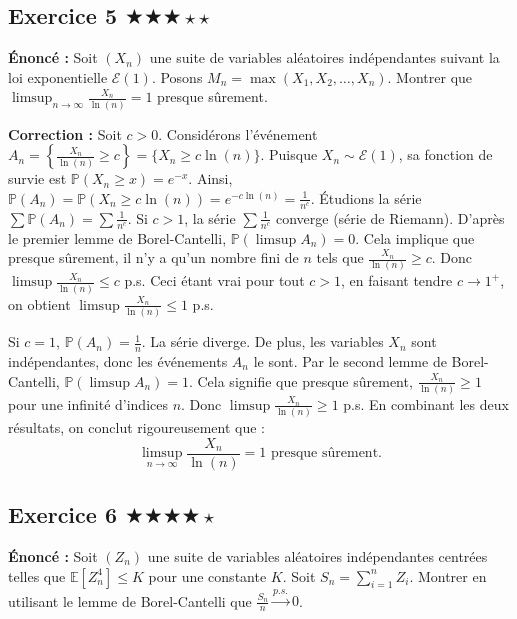 \documentclass[11pt,a4paper]{article}
\begin{document}
\subsection*{Exercice 5 \quad $\bigstar\bigstar\bigstar\star\star$}


\textbf{Énoncé :}
Soit $(X_n)$ une suite de variables aléatoires indépendantes suivant la loi exponentielle $\mathcal{E}(1)$.
Posons $M_n = \max(X_1, X_2, \dots, X_n)$.
Montrer que $\limsup_{n \to \infty} \frac{X_n}{\ln(n)} = 1$ presque sûrement.

\textbf{Correction :}
Soit $c > 0$. Considérons l'événement $A_n = \left\{ \frac{X_n}{\ln(n)} \ge c \right\} = \{ X_n \ge c \ln(n) \}$.
Puisque $X_n \sim \mathcal{E}(1)$, sa fonction de survie est $\mathbb{P}(X_n \ge x) = e^{-x}$.
Ainsi, $\mathbb{P}(A_n) = \mathbb{P}(X_n \ge c \ln(n)) = e^{-c \ln(n)} = \frac{1}{n^c}$.
Étudions la série $\sum \mathbb{P}(A_n) = \sum \frac{1}{n^c}$.
Si $c > 1$, la série $\sum \frac{1}{n^c}$ converge (série de Riemann).
D'après le premier lemme de Borel-Cantelli, $\mathbb{P}(\limsup A_n) = 0$.
Cela implique que presque sûrement, il n'y a qu'un nombre fini de $n$ tels que $\frac{X_n}{\ln(n)} \ge c$.
Donc $\limsup \frac{X_n}{\ln(n)} \le c$ p.s.
Ceci étant vrai pour tout $c > 1$, en faisant tendre $c \to 1^+$, on obtient $\limsup \frac{X_n}{\ln(n)} \le 1$ p.s.

Si $c = 1$, $\mathbb{P}(A_n) = \frac{1}{n}$. La série diverge.
De plus, les variables $X_n$ sont indépendantes, donc les événements $A_n$ le sont.
Par le second lemme de Borel-Cantelli, $\mathbb{P}(\limsup A_n) = 1$.
Cela signifie que presque sûrement, $\frac{X_n}{\ln(n)} \ge 1$ pour une infinité d'indices $n$.
Donc $\limsup \frac{X_n}{\ln(n)} \ge 1$ p.s.
En combinant les deux résultats, on conclut rigoureusement que :
$$ \limsup_{n \to \infty} \frac{X_n}{\ln(n)} = 1 \text{ presque sûrement.} $$


\subsection*{Exercice 6 \quad $\bigstar\bigstar\bigstar\bigstar\star$}


\textbf{Énoncé :}
Soit $(Z_n)$ une suite de variables aléatoires indépendantes centrées telles que $\mathbb{E}[Z_n^4] \le K$ pour une constante $K$.
Soit $S_n = \sum_{i=1}^n Z_i$. Montrer en utilisant le lemme de Borel-Cantelli que $\frac{S_n}{n} \xrightarrow{p.s.} 0$.
\end{document}

